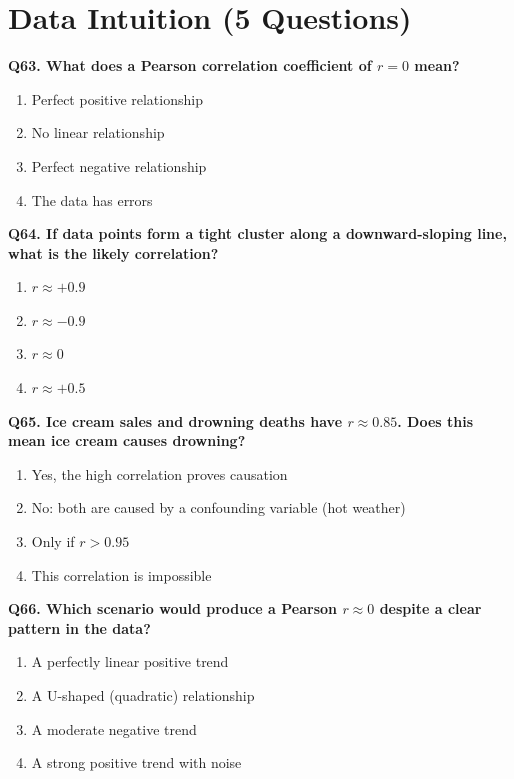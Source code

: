 \documentclass[12pt, a4paper]{article}
\newcommand{\question}[1]{\vspace{0.6em}\noindent\textbf{#1}}
\begin{document}
\section{Data Intuition (5 Questions)}

\question{Q63. What does a Pearson correlation coefficient of $r = 0$ mean?}
\begin{enumerate}[label=\alph*)]
    \item Perfect positive relationship
    \item No linear relationship
    \item Perfect negative relationship
    \item The data has errors
\end{enumerate}

\question{Q64. If data points form a tight cluster along a downward-sloping line, what is the likely correlation?}
\begin{enumerate}[label=\alph*)]
    \item $r \approx +0.9$
    \item $r \approx -0.9$
    \item $r \approx 0$
    \item $r \approx +0.5$
\end{enumerate}

\question{Q65. Ice cream sales and drowning deaths have $r \approx 0.85$. Does this mean ice cream causes drowning?}
\begin{enumerate}[label=\alph*)]
    \item Yes, the high correlation proves causation
    \item No: both are caused by a confounding variable (hot weather)
    \item Only if $r > 0.95$
    \item This correlation is impossible
\end{enumerate}

\question{Q66. Which scenario would produce a Pearson $r \approx 0$ despite a clear pattern in the data?}
\begin{enumerate}[label=\alph*)]
    \item A perfectly linear positive trend
    \item A U-shaped (quadratic) relationship
    \item A moderate negative trend
    \item A strong positive trend with noise
\end{enumerate}
\end{document}

